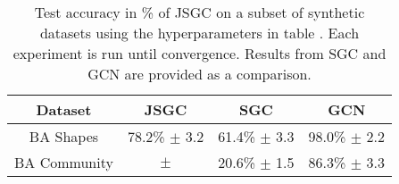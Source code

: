 \begin{table}
    \centering
    \begin{tabular}{c|c|cc}
        \textbf{Dataset} & \textbf{JSGC} & \textbf{SGC} & \textbf{GCN} \\
        \midrule
        BA Shapes       & 78.2\% $\pm$ 3.2 & 61.4\% $\pm$ 3.3 & 98.0\% $\pm$ 2.2 \\
        BA Community    & $\pm$ & 20.6\% $\pm$ 1.5 & 86.3\% $\pm$ 3.3 \\
    \end{tabular}
    \caption{Test accuracy in \% of JSGC on a subset of synthetic datasets using the hyperparameters in table . Each experiment is run until convergence. Results from SGC and GCN are provided as a comparison.}
    \label{tab:SJGC-acc}
\end{table}

